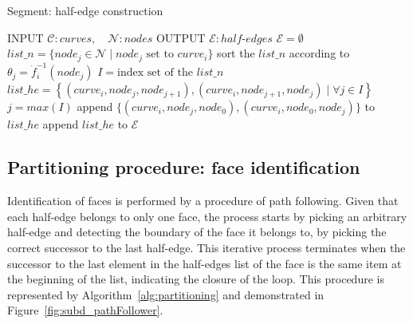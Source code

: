 \begin{algorithm}
  \caption {Segment: half-edge construction}
  \label{alg:halfedgeConstruction}
  \begin{algorithmic}
    \STATE INPUT  $\mathcal{C}:curves, \quad \mathcal{N}:nodes$
    \STATE OUTPUT  $\mathcal{E}:half\text{-}edges$
    \STATE \quad
    \STATE $\mathcal{E} = \emptyset$
    \STATE $list\_n = \{node_j \in \mathcal{N} \mid node_j \text{ set to } curve_i \}$
    \STATE sort the $list\_n$ according to $\theta_j=\dot{f}_{i}^{-1}(node_j)$
    \STATE $I= \text{index set of the } list\_n$
    \STATE $list\_he=\left\{(curve_i,node_j,node_{j+1}),(curve_i,node_{j+1},node_j) \mid \forall j \in I \right\}$
    \STATE $j=max(I)$
    \STATE append $\{(curve_i,node_j,node_{0}),(curve_i,node_0,node_{j})\}$ to $list\_he$
    \ENDIF
    \STATE append $list\_he$ to $\mathcal{E}$
    \ENDFOR    
  \end{algorithmic}
\end{algorithm}


\subsection{Partitioning procedure: face identification}
Identification of faces is performed by a procedure of path following.
Given that each half-edge belongs to only one face, the process starts by picking an arbitrary half-edge and detecting the boundary of the face it belongs to, by picking the correct successor to the last half-edge.
This iterative process terminates when the successor to the last element in the half-edges list of the face is the same item at the beginning of the list, indicating the closure of the loop.
This procedure is represented by Algorithm~\ref{alg:partitioning} and demonstrated in Figure~\ref{fig:subd_pathFollower}.

